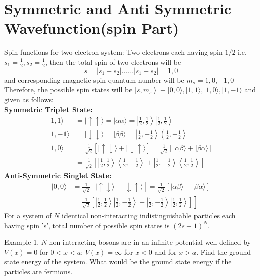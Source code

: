\section{Symmetric and Anti Symmetric Wavefunction(spin Part)}
Spin functions for two-electron system:
Two electrons each having spin $1 / 2$ i.e. $s_{1}=\frac{1}{2}, s_{2}=\frac{1}{2}$, then the total spin of two electrons will be
$$
s=\left|s_{1}+s_{2}\right| \ldots \ldots\left|s_{1}-s_{2}\right|=1,0
$$
and corresponding magnetic spin quantum number will be $m_{s}=1,0,-1,0$
Therefore, the possible spin states will be $\left|s, m_{s}\right\rangle \equiv|0,0\rangle,|1,1\rangle,|1,0\rangle,|1,-1\rangle$ and given as follows:\\
\textbf{Symmetric Triplet State:}\\
$$
\begin{aligned}
|1,1\rangle &=|\uparrow \uparrow\rangle=|\alpha \alpha\rangle=\left|\frac{1}{2}, \frac{1}{2}\right\rangle\left|\frac{1}{2}, \frac{1}{2}\right\rangle \\
|1,-1\rangle &=|\downarrow \downarrow\rangle=|\beta \beta\rangle=\left|\frac{1}{2},-\frac{1}{2}\right\rangle\left(\frac{1}{2},-\frac{1}{2}\right\rangle \\
|1,0\rangle &=\frac{1}{\sqrt{2}}[|\uparrow \downarrow\rangle+|\downarrow \uparrow\rangle]=\frac{1}{\sqrt{2}}[|\alpha \beta\rangle+|\beta \alpha\rangle] \\
&=\frac{1}{\sqrt{2}}\left[\left|\frac{1}{2}, \frac{1}{2}\right\rangle\left\langle\frac{1}{2},-\frac{1}{2}\right\rangle+\left|\frac{1}{2},-\frac{1}{2}\right\rangle\left\langle\frac{1}{2}, \frac{1}{2}\right\rangle\right]
\end{aligned}
$$
\textbf{Anti-Symmetric Singlet State:}
$$
\begin{aligned}
|0,0\rangle &=\frac{1}{\sqrt{2}}[|\uparrow \downarrow\rangle-|\downarrow \uparrow\rangle]=\frac{1}{\sqrt{2}}[|\alpha \beta\rangle-|\beta \alpha\rangle] \\
&\left.=\frac{1}{\sqrt{2}}\left[\left|\frac{1}{2}, \frac{1}{2}\right\rangle\left|\frac{1}{2},-\frac{1}{2}\right\rangle-\left|\frac{1}{2},-\frac{1}{2}\right\rangle\left|\frac{1}{2}, \frac{1}{2}\right\rangle\right]\right]
\end{aligned}
$$
For a system of $N$ identical non-interacting indistinguishable particles each having spin 's', total number of possible spin states is $(2 s+1)^{N}$.
\begin{exercise}
Example 1. $N$ non interacting bosons are in an infinite potential well defined by $V(x)=0$ for $0<x<a$; $V(x)=\infty$ for $x<0$ and for $x>a$. Find the ground state energy of the system. What would be the ground state energy if the particles are fermions.
	\end{exercise}
